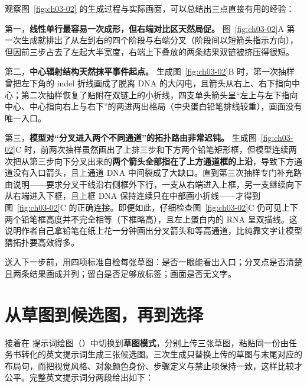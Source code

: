 观察图~\ref{fig:ch03-02} 的生成过程与实际画面，可以总结出三点直接有用的经验：

第一，\textbf{线性单行最容易一次成形，但右端对比区天然局促。} 图~\ref{fig:ch03-02}A 第一次生成就排出了从左到右的四个阶段与右端分叉（阶段间以短箭头指示方向），但因前三步占去了左起大半宽度，右端上下叠放的两条结果双链被挤压得很短。

第二，\textbf{中心辐射结构天然抹平事件起点。} 生成图~\ref{fig:ch03-02}B 时，第一次抽样曾把左下角的 indel 折线画成了脱离 DNA 的大闪电，且箭头从右上、右下指向中心；第二次抽样恢复了贴附在双链上的小折线，四支单头箭头呈“左上与左下指向中心、中心指向右上与右下”的两进两出格局（中央蛋白铅笔排线较重），画面没有唯一入口。

第三，\textbf{模型对“分叉进入两个不同通道”的拓扑路由非常迟钝。} 生成图~\ref{fig:ch03-02}C 时，前两次抽样虽然画出了上排三步和下方两个铅笔矩形框，但模型连续两次把从第三步向下分叉出来的\textbf{两个箭头全部指在了上方通道框的上沿}，导致下方通道没有入口箭头，且上通道 DNA 中间裂成了大缺口。直到第三次抽样专门补充路由说明——要求分叉干线沿右侧框外下行，一支从右端进入上框，另一支继续向下从右端进入下框，且上框 DNA 保持连续只在中部画小折线——才得到图~\ref{fig:ch03-02}C 的正确连接。即便如此，仔细检查图~\ref{fig:ch03-02}C 仍可见上下两个铅笔框高度并不完全相等（下框略高），且左上蛋白内的 RNA 呈双描线。这说明作者自己拿铅笔在纸上花一分钟画出分叉箭头和等高通道，比纯靠文字让模型猜拓扑要高效得多。

送入下一步前，用四项标准自检每张草图：是否一眼能看出入口；分叉点是否清楚且两条结果画成并列；留白是否足够放标签；画面是否无文字。

\section{从草图到候选图，再到选择}

接着在 \scidraw{} 提示词绘图（）中切换到\textbf{草图模式}，分别上传三张草图，粘贴同一份由任务书转化的英文提示词生成三张候选图。三次生成只替换上传的草图与末尾对应的布局句，而把视觉风格、对象颜色身份、步骤定义与禁止项保持一致，这样比较才公平。完整英文提示词分两段给出如下：

